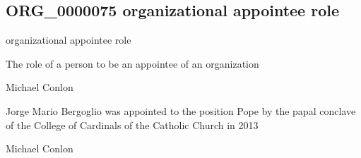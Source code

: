 \documentclass[letterpaper,10pt,english]{sphinxmanual}
\begin{document}
\subsection{ORG\_0000075 \sphinxhyphen{} organizational appointee role}
\label{\detokenize{doc-ORG_0000075:org-0000075-organizational-appointee-role}}\label{\detokenize{doc-ORG_0000075:index-0}}\label{\detokenize{doc-ORG_0000075::doc}}
\begin{sphinxShadowBox}

\sphinxAtStartPar
organizational appointee role
\end{sphinxShadowBox}

\begin{sphinxShadowBox}

\sphinxAtStartPar
{\hyperref[\detokenize{doc-BFO_0000023::doc}]{}}
\end{sphinxShadowBox}

\begin{sphinxShadowBox}

\sphinxAtStartPar
The role of a person to be an appointee of an organization
\end{sphinxShadowBox}

\begin{sphinxShadowBox}

\sphinxAtStartPar
Michael Conlon 
\end{sphinxShadowBox}

\begin{sphinxShadowBox}

\sphinxAtStartPar
Jorge Mario Bergoglio was appointed to the position Pope by the papal conclave of the College of Cardinals of the Catholic Church in 2013
\end{sphinxShadowBox}

\begin{sphinxShadowBox}

\sphinxAtStartPar
Michael Conlon 
\end{sphinxShadowBox}
\begin{quote}

\ignorespaces \end{quote}
\end{document}
